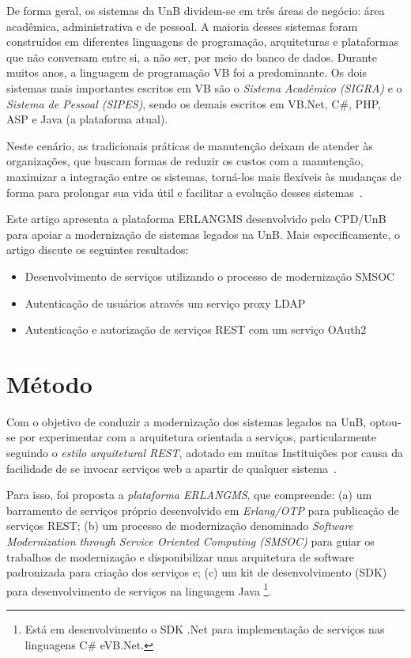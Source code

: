 \documentclass[12pt]{article}
\begin{document}
De forma geral, os sistemas da UnB dividem-se em
três áreas de negócio: área acadêmica, administrativa e de pessoal.
A maioria desses sistemas foram construídos em diferentes linguagens de programação,
arquiteturas e plataformas que não conversam entre
si, a não ser, por meio do banco de dados. Durante muitos anos,
a linguagem de programação VB foi a predominante. Os dois sistemas mais
importantes escritos em VB são o \emph{Sistema Acadêmico (SIGRA)} e
o \emph{Sistema de Pessoal (SIPES)}, sendo os demais escritos
em VB.Net, C\#, PHP, ASP e Java (a plataforma atual). 

Neste cenário, as tradicionais práticas de manutenção deixam 
de atender \`{a}s organizações, que buscam formas de reduzir 
os custos com a manutenção, maximizar a integração entre os sistemas,
torná-los mais flexíveis às mudanças de forma para prolongar sua vida útil e facilitar a evolução
desses sistemas~\cite{S3_Bisbal:1999}. 


Este artigo apresenta a plataforma ERLANGMS desenvolvido pelo CPD/UnB 
para apoiar a modernização de sistemas legados na UnB. Mais
especificamente, o artigo discute os seguintes resultados:

\begin{itemize}

\item Desenvolvimento de serviços utilizando o processo de modernização SMSOC

\item Autenticação de usuários através um serviço proxy LDAP

\item Autenticação e autorização de serviços REST com um serviço OAuth2

\end{itemize} 


\section{Método}


Com o objetivo de conduzir a modernização dos sistemas legados na UnB,
optou-se por experimentar com a arquitetura orientada a servi\c cos, particularmente 
seguindo o \emph{estilo arquitetural REST}, adotado 
em muitas Instituições por causa
da facilidade de se invocar serviços 
web a apartir de qualquer sistema~\cite{fielding2000architectural}. 

Para isso, foi proposta a \emph{plataforma ERLANGMS}, 
que compreende: (a) um barramento de serviços próprio 
desenvolvido em \emph{Erlang/OTP} para publicação de serviços REST;
(b) um processo de modernização
denominado \emph{Software Modernization through Service Oriented Computing (SMSOC)} 
para guiar os trabalhos de modernização e disponibilizar uma arquitetura de 
software padronizada para criação dos serviços e;
(c) um kit de desenvolvimento (SDK) para desenvolvimento de serviços na linguagem Java
\footnote{Está em desenvolvimento o SDK .Net para implementação de serviços nas linguagens C\# eVB.Net.}.
\end{document}
